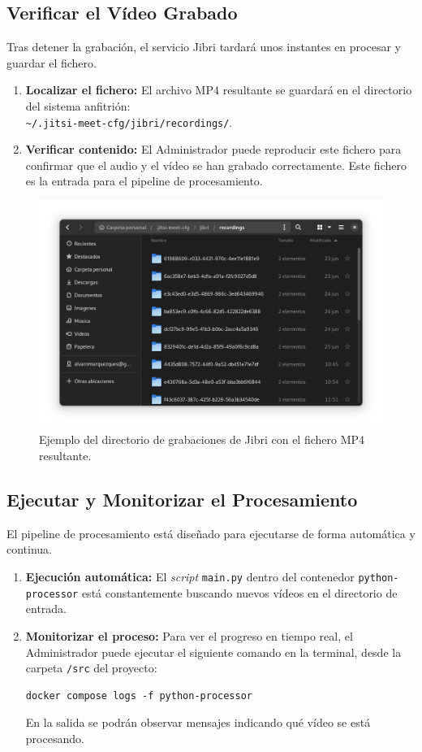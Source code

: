 \subsection{Verificar el Vídeo Grabado}
Tras detener la grabación, el servicio Jibri tardará unos instantes en procesar y guardar el fichero.
\begin{enumerate}
    \item \textbf{Localizar el fichero:} El archivo MP4 resultante se guardará en el directorio del sistema anfitrión: \\ \texttt{\textasciitilde{}/.jitsi-meet-cfg/jibri/recordings/}.
    \item \textbf{Verificar contenido:} El Administrador puede reproducir este fichero para confirmar que el audio y el vídeo se han grabado correctamente. Este fichero es la entrada para el pipeline de procesamiento.
\end{enumerate}

\begin{figure}[H]
    \centering
    \includegraphics[width=\textwidth]{img/carpetarecordings.png}
    \caption{Ejemplo del directorio de grabaciones de Jibri con el fichero MP4 resultante.}
    \label{fig:manual_carpeta_grabaciones}
\end{figure}

\subsection{Ejecutar y Monitorizar el Procesamiento}
El pipeline de procesamiento está diseñado para ejecutarse de forma automática y continua.
\begin{enumerate}
    \item \textbf{Ejecución automática:} El \textit{script} \texttt{main.py} dentro del contenedor \texttt{python-processor} está constantemente buscando nuevos vídeos en el directorio de entrada.
    \item \textbf{Monitorizar el proceso:} Para ver el progreso en tiempo real, el Administrador puede ejecutar el siguiente comando en la terminal, desde la carpeta \texttt{/src} del proyecto:
    \begin{verbatim}
docker compose logs -f python-processor
    \end{verbatim}
    En la salida se podrán observar mensajes indicando qué vídeo se está procesando.
\end{enumerate}

